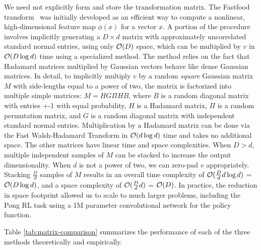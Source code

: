 \documentclass{article} %
\begin{document}
We need not explicitly form and store the transformation matrix. The Fastfood transform~\citep{le2013fastfood} was initially developed as an efficient way to compute a nonlinear, high-dimensional feature map $\phi(x)$ for a vector $x$. A portion of the procedure involves implicitly generating a $D \times d$ matrix with approximately uncorrelated standard normal entries, using only $\mathcal{O}(D)$ space, which can be multiplied by $v$ in $\mathcal{O}(D\log{d})$ time using a specialized method. The method relies on the fact that Hadamard matrices multiplied by Gaussian vectors behave like dense Gaussian matrices. In detail, to implicitly multiply $v$ by a random \textit{square} Gaussian matrix $M$ with side-lengths equal to a power of two, the matrix is factorized into multiple simple matrices: $M = H G \Pi H B$, where $B$ is a random diagonal matrix with entries +-1 with equal probability, $H$ is a Hadamard matrix, $\Pi$ is a random permutation matrix, and $G$ is a random diagonal matrix with independent standard normal entries. Multiplication by a Hadamard matrix can be done via the Fast Walsh-Hadamard Transform in $\mathcal{O}(d\log{d})$ time and takes no additional space. The other matrices have linear time and space complexities. When $D > d$, multiple independent samples of $M$ can be stacked to increase the output dimensionality. When $d$ is not a power of two, we can zero-pad $v$ appropriately. Stacking $\frac{D}{d}$ samples of $M$ results in an overall time complexity of $\mathcal{O}(\frac{D}{d}d\log{d})$ = $\mathcal{O}(D\log{d})$, and a space complexity of $\mathcal{O}(\frac{D}{d}d)$ = $\mathcal{O}(D)$. In practice, the reduction in space footprint allowed us to scale to much larger problems, including the Pong RL task using a 1M parameter convolutional network for the policy function.

Table \ref{tab:matrix-comparison} summarizes the performance of each of the three methods theoretically and empirically.
\end{document}
